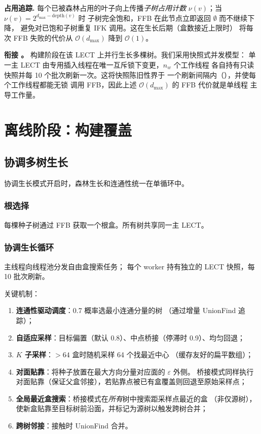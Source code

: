 \documentclass[journal]{IEEEtran}
\begin{document}
\textbf{占用追踪.}
每个已被森林占用的叶子向上传播\emph{子树占用计数}
$\nu(v)$；当 $\nu(v)=2^{d_{\max}-\mathrm{depth}(v)}$ 时
子树完全饱和，FFB 在此节点立即返回 $\emptyset$ 而不继续下降，
避免对已饱和子树重复 IFK 调用。这在生长后期（盒数接近上限时）
将每次 FFB 失败的代价从 $\mathcal{O}(d_{\max})$ 降到 $\mathcal{O}(1)$。

\textbf{衔接 。}
构建阶段在该 LECT 上并行生长多棵树。我们采用快照式并发模型：
单一主 LECT 由专用插入线程在唯一互斥锁下变更，$n_w$ 个工作线程
各自持有只读快照并每 10 个批次刷新一次。这将快照陈旧性界于
一个刷新间隔内（），并使每个工作线程都能无锁
调用 FFB，因此上述 $\mathcal{O}(d_{\max})$ 的 FFB 代价就是单线程
主导工作量。

\section{离线阶段：构建覆盖}\label{sec:build}

\subsection{协调多树生长}

协调生长模式开启时，森林生长和连通性统一在单循环中。

\subsubsection{根选择}
每棵种子树通过 FFB 获取一个根盒。所有树共享同一主 LECT。

\subsubsection{协调生长循环}
主线程向线程池分发自由盒搜索任务；
每个 worker 持有独立的 LECT 快照，每 10 批次刷新。

关键机制：
\begin{enumerate}[nosep]
  \item \textbf{连通性驱动调度}：0.7 概率选最小连通分量的树
    （通过增量 UnionFind 追踪）；
  \item \textbf{自适应采样}：目标偏置（默认 0.8）、中点桥接（停滞时 0.9）、均匀回退；
  \item \textbf{$K$ 子采样}：$>64$ 盒时随机采样 64 个找最近中心
    （缓存友好的扁平数组）；
  \item \textbf{对面贴靠}：将种子放置在最大方向分量对应面的 $\varepsilon$ 外侧。
    桥接模式同样执行对面贴靠（保证父盒邻接），若贴靠点被已有盒覆盖则回退至原始采样点；
  \item \textbf{全局最近盒搜索}：桥接模式在\emph{所有}树中搜索距采样点最近的盒
    （非仅源树），使新盒贴靠至目标树前沿面，并标记为源树以触发跨树合并；
  \item \textbf{跨树邻接}：接触时 UnionFind 合并。
\end{enumerate}
\end{document}
